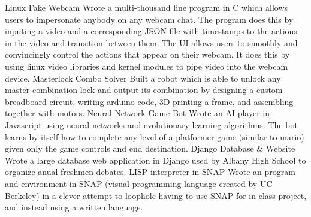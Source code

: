 


\begin{cvskills}

  \cvskill
    {Linux Fake Webcam} %
    {Wrote a multi-thousand line program in C which allows users to impersonate anybody on any webcam chat. The program does this by inputing a video and a corresponding JSON file with timestamps to the actions in the video and transition between them. The UI allows users to smoothly and convincingly control the actions that appear on their webcam. It does this by using linux video libraries and kernel modules to pipe video into the webcam device.} %
\cvskill
    {Masterlock Combo Solver} %
    {Built a robot which is able to unlock any master combination lock and output its combination by designing a custom breadboard circuit, writing arduino code, 3D printing a frame, and assembling together with motors.} %
\cvskill
  {Neural Network Game Bot}
  {Wrote an AI player in Javascript using neural networks and evolutionary learning algorithms. The bot learns by itself how to complete any level of a platformer game (similar to mario) given only the game controls and end destination.}
  \cvskill
    {Django Database \& Website} %
    {Wrote a large database web application in Django used by Albany High School to organize anual freshmen debates.} %
  \cvskill
    {LISP interpreter in SNAP} %
    {Wrote an program and environment in  SNAP (visual programming language created by UC Berkeley) in a clever attempt to loophole having to use SNAP for in-class project, and instead using a written language.} %

\end{cvskills}
